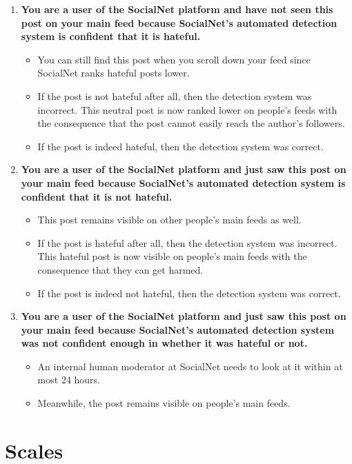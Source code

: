 \begin{enumerate}
    \item \textbf{You are a user of the SocialNet platform and have \textbf{not} seen this post on your main feed because SocialNet's automated detection system is confident that it is hateful.}
          \begin{itemize}
              \item You can still find this post when you scroll down your feed since SocialNet ranks hateful posts lower.
              \item If the post is not hateful after all, then the detection system was incorrect. This neutral post is now ranked lower on people's feeds with the consequence that the post cannot easily reach the author's followers.
              \item If the post is indeed hateful, then the detection system was correct.
          \end{itemize}
    \item \textbf{You are a user of the SocialNet platform and just saw this post on your main feed because SocialNet's automated detection system is confident that it is \textbf{not hateful}.}
          \begin{itemize}
              \item This post remains visible on other people's main feeds as well.
              \item If the post is hateful after all, then the detection system was incorrect. This hateful post is now visible on people's main feeds with the consequence that they can get harmed.
              \item If the post is indeed not hateful, then the detection system was correct.
          \end{itemize}
    \item \textbf{You are a user of the SocialNet platform and just saw this post on your main feed because SocialNet's automated detection system was not confident enough in whether it was hateful or not.}
          \begin{itemize}
              \item An internal human moderator at SocialNet needs to look at it within at most 24 hours.
              \item Meanwhile, the post remains visible on people's main feeds.
          \end{itemize}
\end{enumerate}

\section{Scales}
